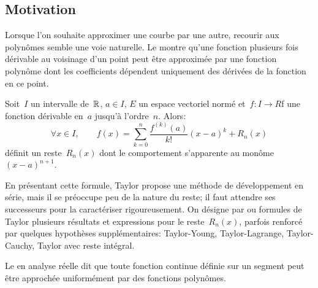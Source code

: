 \subsection{Motivation} 
Lorsque l'on souhaite approximer une courbe par une autre, recourir aux polynômes semble une voie naturelle. Le  montre qu'une fonction plusieurs fois dérivable au voisinage d'un point peut être approximée par une fonction polynôme dont les coefficients dépendent uniquement des dérivées de la fonction en ce point. 
\begin{theoreme}
Soit~$I$ un intervalle de~$\mathbb R$, $a\in I$, $E$ un espace vectoriel normé et~$f: I\rightarrow R$f une fonction dérivable en~$a$ 
jusqu’à l’ordre~$n$. Alors:
\begin{equation}
\forall x\in I, \qquad
f(x) =\sum_{k=0}^n \frac{f^{(k)}(a)}{k!}(x-a)^k + R_n(x)
\end{equation}
définit un reste~$R_n(x)$ dont le comportement s’apparente au monôme~$(x-a)^{n+1}$.
\end{theoreme}
En présentant cette formule, Taylor propose une méthode de développement en série, mais il se préoccupe peu de la 
nature du reste; il faut attendre ses successeurs pour la caractériser rigoureusement.
On désigne par  ou formules de Taylor plusieurs résultats et expressions pour le reste~$R_n(x)$, 
parfois renforcé par quelques hypothèses supplémentaires: 
Taylor-Young,
Taylor-Lagrange,
Taylor-Cauchy,
Taylor avec reste intégral.

Le  en analyse réelle dit que toute fonction continue définie sur un segment peut être approchée uniformément par des fonctions polynômes. 


